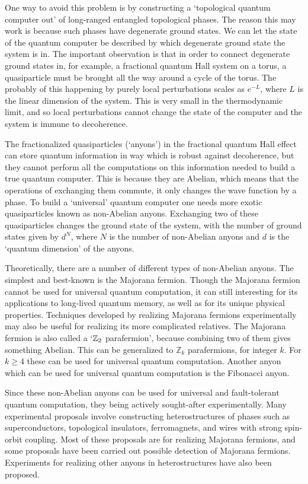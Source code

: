 One way to avoid this problem is by constructing a `topological quantum computer out' of long-ranged entangled topological phases. The reason this may work is because such phases have degenerate ground states. We can let the state of the quantum computer be described by which degenerate ground state the system is in. The important observation is that in order to connect degenerate ground states in, for example, a fractional quantum Hall system on a torus, a quasiparticle must be brought all the way around a cycle of the torus. The probably of this happening by purely local perturbations scales as $e^{-L}$, where $L$ is the linear dimension of the system. This is very small in the thermodynamic limit, and so local perturbations cannot change the state of the computer and the system is immune to decoherence.

The fractionalized quasiparticles (`anyons') in the fractional quantum Hall effect can store quantum information in way which is robust against decoherence, but they cannot perform all the computations on this information needed to build a true quantum computer. This is because they are Abelian, which means that the operations of exchanging them commute, it only changes the wave function by a phase. To build a `universal' quantum computer one needs more exotic quasiparticles known as non-Abelian anyons. Exchanging two of these quasiparticles changes the ground state of the system, with the number of ground states given by $d^N$, where $N$ is the number of non-Abelian anyons and $d$ is the `quantum dimension' of the anyons. 

Theoretically, there are a number of different types of non-Abelian anyons. The simplest and best-known is the Majorana fermion. Though the Majorana fermion cannot be used for universal quantum computation, it can still interesting for its applications to long-lived quantum memory\cite{KitaevWireMajorana:01}, as well as for its unique physical properties. Techniques developed by realizing Majorana fermions experimentally may also be useful for realizing its more complicated relatives. The Majorana fermion is also called a `$\mathbb{Z}_2$ parafermion', because combining two of them gives something Abelian. This can be generalized to $\mathbb{Z}_k$ parafermions, for integer $k$. For $k\ge 4$ these can be used for universal quantum computation\cite{CuiWang}. Another anyon which can be used for universal quantum computation is the Fibonacci anyon.

Since these non-Abelian anyons can be used for universal and fault-tolerant quantum computation, they being actively sought-after experimentally. Many experimental proposals involve constructing heterostructures of phases such as superconductors, topological insulators, ferromagnets, and wires with strong spin-orbit coupling\cite{AliceaReview}. Most of these proposals are for realizing Majorana fermions, and some proposals have been carried out possible detection of Majorana fermions\cite{MourikZuo:InSbWire:2012,Nadj-PergeYazdani:2014}. Experiments for realizing other anyons in heterostructures have also been proposed\cite{SOCALBS}.

